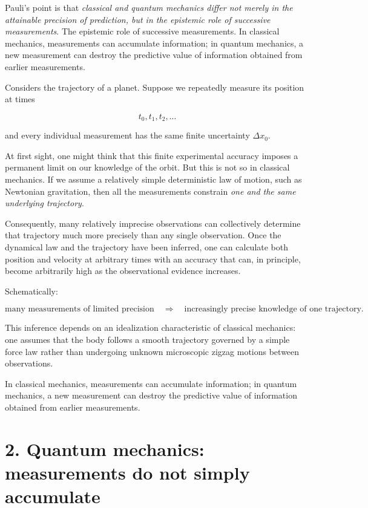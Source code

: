 Pauli's point is that \emph{classical and quantum mechanics differ not merely in the attainable precision of prediction, but in the epistemic role of successive measurements}. The epistemic role of successive measurements. In classical mechanics, measurements can accumulate information; in quantum mechanics, a new measurement can destroy the predictive value of information obtained from earlier measurements.

Considers the trajectory of a planet. Suppose we repeatedly measure its position at times

\begin{equation*}
t_0,t_1,t_2,\ldots
\end{equation*}

and every individual measurement has the same finite uncertainty $\Delta x_0$.

At first sight, one might think that this finite experimental accuracy imposes a permanent limit on our knowledge of the orbit. But this is not so in classical mechanics. If we assume a relatively simple deterministic law of motion, such as Newtonian gravitation, then all the measurements constrain \emph{one and the same underlying trajectory}.

Consequently, many relatively imprecise observations can collectively determine that trajectory much more precisely than any single observation. Once the dynamical law and the trajectory have been inferred, one can calculate both position and velocity at arbitrary times with an accuracy that can, in principle, become arbitrarily high as the observational evidence increases.

Schematically:

\begin{equation*}
\text{many measurements of limited precision}
\quad\Longrightarrow\quad
\text{increasingly precise knowledge of one trajectory}.
\end{equation*}

This inference depends on an idealization characteristic of classical mechanics: one assumes that the body follows a smooth trajectory governed by a simple force law rather than undergoing unknown microscopic zigzag motions between observations.

In classical mechanics, measurements can accumulate information; in quantum mechanics, a new measurement can destroy the predictive value of information obtained from earlier measurements.



\section*{2. Quantum mechanics: measurements do not simply accumulate}

